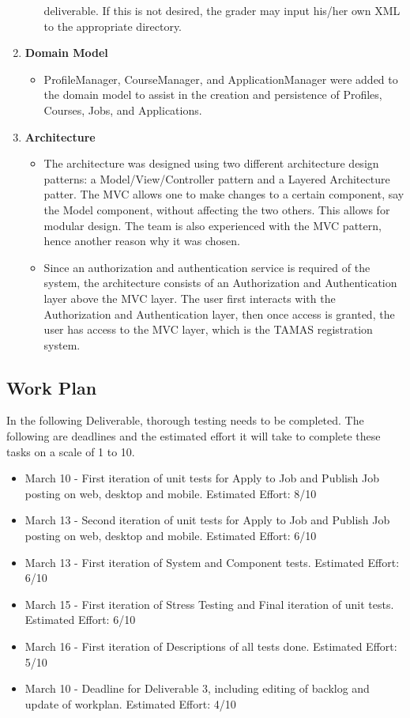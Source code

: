 \documentclass[12pt]{article}
\begin{document}
\begin{enumerate}
\begin{itemize}
            deliverable. If this is not desired, the grader may input his/her own XML to the
            appropriate directory.
    \end{itemize}
    \item \textbf{Domain Model}
    \begin{itemize}
        \item ProfileManager, CourseManager, and ApplicationManager were added to the domain model
            to assist in the creation and persistence of Profiles, Courses, Jobs, and Applications.
    \end{itemize}
    \item \textbf{Architecture}
    \begin{itemize}
        \item The architecture was designed using two different architecture design patterns: a Model/View/Controller pattern and a Layered Architecture patter. The MVC allows one to make changes to a certain component, say the Model component, without affecting the two others. This allows for modular design. The team is also experienced with the MVC pattern, hence another reason why it was chosen.
        \item Since an authorization and authentication service is required of the system, the architecture consists of an Authorization and Authentication layer above the MVC layer. The user first interacts with the Authorization and Authentication layer, then once access is granted, the user has access to the MVC layer, which is the TAMAS registration system.
    \end{itemize}
\end{enumerate}

\subsection{Work Plan}

In the following Deliverable, thorough testing needs to be completed. The following are deadlines and the estimated effort it will take to complete these tasks on a scale of 1 to 10.

\begin{itemize}
    \item March 10 - First iteration of unit tests for Apply to Job and Publish Job posting on web, desktop and mobile. Estimated Effort: 8/10
    \item March 13 - Second iteration of unit tests for Apply to Job and Publish Job posting on web, desktop and mobile. Estimated Effort: 6/10
    \item March 13 - First iteration of System and Component tests. Estimated Effort: 6/10
    \item March 15 - First iteration of Stress Testing and Final iteration of unit tests. Estimated Effort: 6/10
    \item March 16 - First iteration of Descriptions of all tests done. Estimated Effort: 5/10
    \item March 10 - Deadline for Deliverable 3, including editing of backlog and update of workplan. Estimated Effort: 4/10

\end{itemize}
\end{document}
